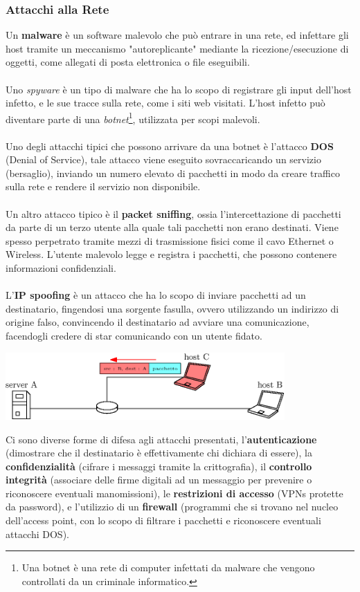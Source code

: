 \documentclass[12pt, letterpaper]{article}
\newcommand{\acc}{\\\hphantom{}\\}
\begin{document}
\subsubsection{Attacchi alla Rete}
Un \textbf{malware} è un software malevolo che può entrare in una rete, ed infettare gli host tramite un
meccanismo "autoreplicante" mediante la ricezione/esecuzione di oggetti, come allegati di posta elettronica
o file eseguibili.\acc Uno \textit{spyware} è un tipo di malware che ha lo scopo di registrare gli input
dell'host infetto, e le sue tracce sulla rete, come i siti web visitati. L'host infetto può diventare parte
di una \textit{botnet}\footnote{Una botnet è una rete di computer infettati da malware che vengono controllati da un criminale informatico.},
utilizzata per scopi malevoli.\acc
Uno degli attacchi tipici che possono arrivare da una botnet è l'attacco \textbf{DOS} (Denial of Service),
tale attacco viene eseguito sovraccaricando un servizio (bersaglio), inviando un numero elevato di pacchetti in modo
da creare traffico sulla rete e rendere il servizio non disponibile.\acc
Un altro attacco tipico è il \textbf{packet sniffing}, ossia l'intercettazione di pacchetti da parte di un terzo
utente alla quale tali pacchetti non erano destinati. Viene spesso perpetrato tramite mezzi di
trasmissione fisici come il cavo Ethernet o Wireless. L'utente malevolo legge e registra i pacchetti, che possono
contenere informazioni confidenziali.\acc
L'\textbf{IP spoofing} è un attacco che ha lo scopo di inviare pacchetti ad un destinatario, fingendosi una
sorgente fasulla, ovvero utilizzando un indirizzo di origine falso, convincendo il destinatario ad avviare una comunicazione, facendogli
credere di star comunicando con un utente fidato.\begin{center}
    \includegraphics[width=0.8\textwidth ]{images/spoofing.eps}
\end{center}
Ci sono diverse forme di difesa agli attacchi presentati, l'\textbf{autenticazione} (dimostrare che il destinatario
è effettivamente chi dichiara di essere), la \textbf{confidenzialità} (cifrare i messaggi tramite la crittografia),
il \textbf{controllo integrità} (associare delle firme digitali ad un messaggio per prevenire o riconoscere eventuali
manomissioni), le \textbf{restrizioni di accesso} (VPNs protette da password), e l'utilizzio di un
\textbf{firewall} (programmi che si trovano nel nucleo dell'access point, con lo scopo di filtrare i pacchetti
e riconoscere eventuali attacchi DOS).
\end{document}
